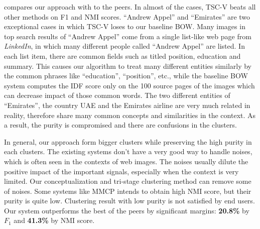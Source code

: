  compares our approach with to the peers.
In almost of the cases, TSC-V beats all other methods on F1 and NMI scores.
``Andrew Appel'' and ``Emirates'' are two exceptional cases in which
TSC-V loses to our baseline BOW.
Many images in top search results of ``Andrew Appel'' come from
a single list-like web page from \emph{LinkedIn}, in which many different
people called ``Andrew Appel'' are listed.
In each list item, there are common fields such as titled position,
education and summary. This causes our algorithm to
treat many different entities similarly by the common phrases like
``education'', ``position'', etc., while the baseline BOW system computes
the IDF score only on the 100 source pages of the images which can
decrease impact of those common words.
The two different entities of ``Emirates'', the country UAE and the Emirates airline
are very much related in reality, therefore share many common concepts and
similarities in the context. As a result, the purity is compromised and
there are confusions in the clusters.

In general, our approach form bigger clusters while preserving
the high purity in each clusters. The existing systems don't have
a very good way to handle noises, which is often seen in the contexts of
web images. The noises usually dilute the positive impact of the important
signals, especially when the context is very limited. Our conceptualization
and tri-stage clustering method can remove some of noises.
Some systems like MMCP intends to obtain high NMI score,
but their purity is quite low. Clustering result with low purity is
not satisfied by end users. Our system outperforms the best of the peers
by significant margins: {\bf 20.8\%} by $F_1$ and {\bf 41.3\%} by NMI score.



